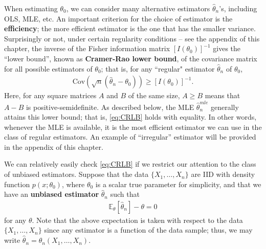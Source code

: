 \documentclass[10.5pt, A4paper, openany, uplatex]{book}
\newcommand{\E}{\mathbb{E}}
\newcommand{\Cov}{\mathrm{Cov}}
\renewcommand{\hat}{\widehat}
\numberwithin{equation}{section}
\begin{document}
When estimating $\theta_0$, we can consider many alternative estimators $\hat \theta_n$'s, including OLS, MLE, etc.
An important criterion for the choice of estimator is the \textbf{efficiency}; the more efficient estimator is the one that has the smaller variance.
Surprisingly or not, under certain regularity conditions --	see the appendix of this chapter, the inverse of the Fisher information matrix $[I(\theta_0)]^{-1}$ gives the ``lower bound'', known as \textbf{Cramer-Rao lower bound}, of the covariance matrix for all possible estimators of $\theta_0$; that is, for any ``regular" estimator $\hat \theta_n$ of $\theta_0$,
\begin{align}\label{eq:CRLB}
	\Cov\left(\sqrt{n}(\hat \theta_n - \theta_0)\right) \ge [I(\theta_0)]^{-1}.
\end{align}
Here, for any square matrices $A$ and $B$ of the same size, $A \ge B$ means that $A - B$ is positive-semidefinite.
As described below, the MLE $\hat \theta_n^{mle}$ generally attains this lower bound; that is, \eqref{eq:CRLB} holds with equality.
In other words, whenever the MLE is available, it is the most efficient estimator we can use in the class of regular estimators.
An example of ``irregular'' estimator will be provided in the appendix of this chapter.
\bigskip

We can relatively easily check \eqref{eq:CRLB} if we restrict our attention to the class of unbiased estimators.
Suppose that the data $\{X_1, \ldots , X_n\}$ are IID with density function $p(x; \theta_0)$, where $\theta_0$ is a scalar true parameter for simplicity, and that we have an \textbf{unbiased estimator} $\hat \theta_n$ such that
\begin{align}\label{eq:unbiased}
	\E_\theta[\hat \theta_n] - \theta = 0
\end{align}
for any $\theta$.
Note that the above expectation is taken with respect to the data $\{X_1, \ldots , X_n\}$ since any estimator is a function of the data sample; thus, we may write $\hat \theta_n = \theta_n(X_1, \ldots , X_n)$.
\bigskip
\end{document}

